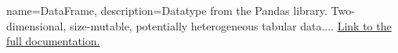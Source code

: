 
{
    name=DataFrame,
    description={Datatype from the Pandas library. Two-dimensional, size-mutable, potentially heterogeneous tabular data.... \href{https://pandas.pydata.org/pandas-docs/stable/reference/api/pandas.DataFrame.html}{Link to the full documentation.}}
}
